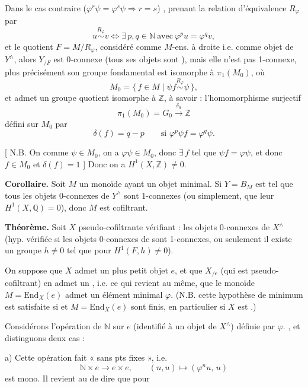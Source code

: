 \documentclass[11pt,a4paper]{article}
\begin{document}

Dans le cas contraire
($\varphi^{r}\psi = \varphi^{s}\psi \Longrightarrow r = s$) , prenant la relation d'équivalence $R_\varphi$
 par
\[
  u \overset{R_\varphi}{\sim} v \iff \exists\, p,q \in \mathbb{N}
  \ \text{avec}\ \varphi^{p}u = \varphi^{q}v ,
\]
et \ill{} le quotient $F = M/R_\varphi$, considéré comme $M$-ens. à droite
 i.e. comme objet de $Y^\wedge$, alors $Y_{/F}$ est
0-connexe (tous ses objets sont ), mais elle n'est pas
1-connexe, plus précisément son groupe fondamental est isomorphe à
$\pi_1(M_0)$, où
\[
  M_0 = \{\, f \in M \mid \psi f \overset{R_\varphi}{\sim} \psi \,\} ,
\]
et admet un groupe quotient isomorphe à $\mathbb{Z}$, à savoir : l'homomorphisme
surjectif
\[
  \pi_1(M_0) = G_0 \xrightarrow{\ \delta_0\ } \mathbb{Z}
\]
\ill{} défini sur $M_0$ par
\[
  \delta(f) = q - p \qquad \text{si } \varphi^{p}\psi f = \varphi^{q}\psi .
\]

[ N.B. On \struck{\ill{}} \ill{} comme $\psi \in M_0$, on a $\varphi\psi \in M_0$,
\struck{\ill{}} donc $\exists\, f$ tel que $\psi f = \varphi\psi$, et donc
$f \in M_0$ et $\delta(f) = 1$ ] Donc on a $H^{1}(X,\mathbb{Z}) \ne 0$.


 

\textbf{Corollaire.} Soit $M$ un monoïde ayant un objet minimal. Si
 \ill{} $Y = B_M$ est tel que tous les objets 0-connexes de
$Y^\wedge$ sont 1-connexes (ou simplement, que leur $H^{1}(X,\mathbb{Q}) = 0$),
donc $M$ est cofiltrant.

\textbf{Théorème.} Soit $X$  
pseudo-cofiltrante \ill{} vérifiant : les objets 0-connexes de $X^\wedge$
(hyp. vérifiée si les objets 0-connexes de \ill{} sont 1-connexes, ou \ill{}
seulement il existe un groupe  $h \ne 0$ tel que pour \ill{}
$H^{1}(F,h) \ne 0$).

On suppose que $X$ admet  un plus  petit objet
$e$, et que $X_{/e}$ (qui est \struck{\ill{}} pseudo-cofiltrant) en admet un
, \ill{} i.e. ce qui revient au même, que le monoïde
$M = \mathrm{End}_X(e)$ admet un  élément minimal $\varphi$.
(N.B. cette hypothèse de minimum est satisfaite si 
et $M = \mathrm{End}_X(e)$ sont finis, en particulier si $X$ est
.)


Considérons l'opération de $\mathbb{N}$ sur $e$ (identifié à un objet de
$X^\wedge$) définie par $\varphi$. ,
et distinguons deux cas :

a) Cette opération  fait « sans pts fixes », i.e.
\[
  \mathbb{N} \times e \longrightarrow e \times e ,\qquad
  (n,u) \longmapsto (\varphi^{n}u,\, u)
\]
est mono. Il revient au \ill{} de dire que pour
\end{document}
